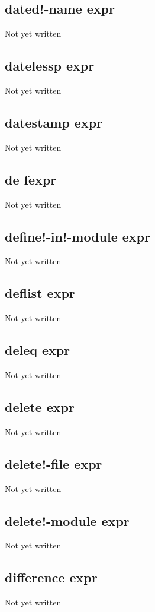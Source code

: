 \documentclass[a4paper,11pt]{article}
\begin{document}
\subsection{\ttfamily dated!-name expr}
Not yet written

\subsection{\ttfamily datelessp expr}
Not yet written

\subsection{\ttfamily datestamp expr}
Not yet written

\subsection{\ttfamily de fexpr}
Not yet written

\subsection{\ttfamily define!-in!-module expr}
Not yet written

\subsection{\ttfamily deflist expr}
Not yet written

\subsection{\ttfamily deleq expr}
Not yet written

\subsection{\ttfamily delete expr}
Not yet written

\subsection{\ttfamily delete!-file expr}
Not yet written

\subsection{\ttfamily delete!-module expr}
Not yet written

\subsection{\ttfamily difference expr}
Not yet written
\end{document}
